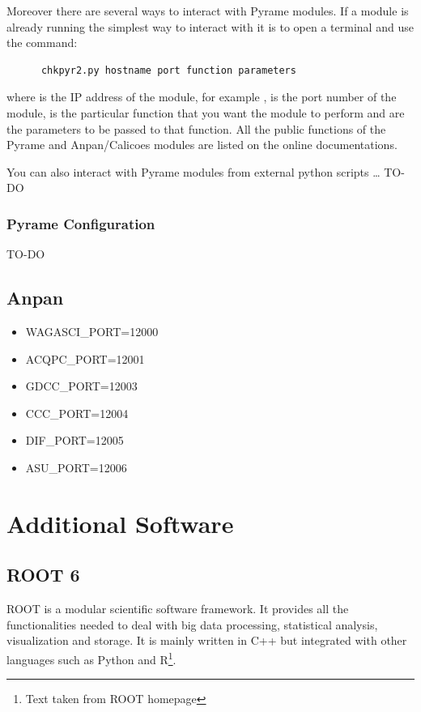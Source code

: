 Moreover there are several ways to interact with Pyrame modules. If a module is
already running the simplest way to interact with it is to open a terminal and
use the command:
\begin{lstlisting}
      chkpyr2.py hostname port function parameters
\end{lstlisting}
where  is the IP address of the module, for example
,  is the port number of the module,
 is the particular function that you want the module to
perform and  are the parameters to be passed to that
function. All the public functions of the Pyrame and Anpan/Calicoes modules are
listed on the online documentations.

You can also interact with Pyrame modules from external python scripts \dots
TO-DO

\subsection{Pyrame Configuration}\label{sec:pyrame-configuration}

TO-DO


\section{Anpan}
\begin{itemize}
\item WAGASCI\_PORT=12000
\item ACQPC\_PORT=12001
\item GDCC\_PORT=12003
\item CCC\_PORT=12004
\item DIF\_PORT=12005
\item ASU\_PORT=12006
\end{itemize}

\chapter{Additional Software}
\section{ROOT 6}
ROOT is a modular scientific software framework. It provides all the
functionalities needed to deal with big data processing, statistical analysis,
visualization and storage. It is mainly written in C++ but integrated with other
languages such as Python and R\footnote{Text taken from ROOT homepage}.

